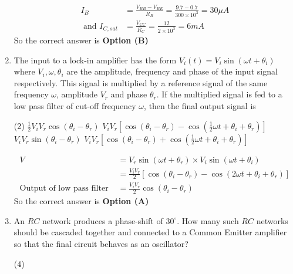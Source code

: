 \begin{enumerate}
\begin{answer}
\begin{align*}
I_{B}&=\frac{V_{B B}-V_{B E}}{R_{B}}=\frac{9.7-0.7}{300 \times 10^{3}}=30 \mu A\\\text{ and } I_{C, s a t}&=\frac{V_{C C}}{R_{C}}=\frac{12}{2 \times 10^{3}}=6 m A
\end{align*}
So the correct answer is \textbf{Option (B)}
\end{answer}
	\item The input to a lock-in amplifier has the form $V_{i}(t)=V_{i} \sin \left(\omega t+\theta_{i}\right)$ where $V_{i}, \omega, \theta_{i}$ are the amplitude, frequency and phase of the input signal respectively. This signal is multiplied by a reference signal of the same frequency $\omega$, amplitude $V_{r}$ and phase $\theta_{r}$. If the multiplied signal is fed to a low pass filter of cut-off frequency $\omega$, then the final output signal is
{	}
\begin{tasks}(2)
\task[\textbf{A.}] $\frac{1}{2} V_{i} V_{r} \cos \left(\theta_{i}-\theta_{r}\right)$
\task[\textbf{B.}] $V_{i} V_{r}\left[\cos \left(\theta_{i}-\theta_{r}\right)-\cos \left(\frac{1}{2} \omega t+\theta_{i}+\theta_{r}\right)\right]$
\task[\textbf{C.}] $V_{i} V_{r} \sin \left(\theta_{i}-\theta_{r}\right)$
\task[\textbf{D.}] $V_{i} V_{r}\left[\cos \left(\theta_{i}-\theta_{r}\right)+\cos \left(\frac{1}{2} \omega t+\theta_{i}+\theta_{r}\right)\right]$
\end{tasks}
\begin{answer}
\begin{align*}
V&=V_{r} \sin \left(\omega t+\theta_{r}\right) \times V_{i} \sin \left(\omega t+\theta_{i}\right)\\&=\frac{V_{i} V_{r}}{2}\left[\cos \left(\theta_{i}-\theta_{r}\right)-\cos \left(2 \omega t+\theta_{i}+\theta_{r}\right)\right]\\
\text{Output of low pass filter }&=\frac{V_{i} V_{r}}{2} \cos \left(\theta_{i}-\theta_{r}\right)
\end{align*}
So the correct answer is \textbf{Option (A)}
\end{answer}
	\item An $R C$ network produces a phase-shift of $30^{\circ}$. How many such $R C$ networks should be cascaded together and connected to a Common Emitter amplifier so that the final circuit behaves as an oscillator?
{	}
\begin{tasks}(4)

\end{tasks}
\end{enumerate}
